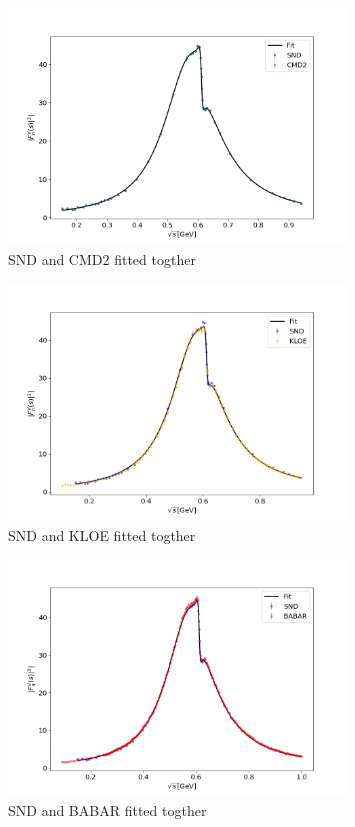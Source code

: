 \documentclass[a4paper]{article}
\begin{document}
\begin{figure}[H]
    \centering
    \includegraphics[width=0.8\textwidth]{./plots/SND-CMD2.png}
    \caption{SND and CMD2 fitted togther\label{fig5}}
\end{figure}
\begin{figure}[H]
    \centering
    \includegraphics[width=0.8\textwidth]{./plots/SND-KLOE.png}
    \caption{SND and KLOE fitted togther    \label{fig6}}
\end{figure}
\begin{figure}[H]
    \centering
    \includegraphics[width=0.8\textwidth]{./plots/SND-BABAR.png}
    \caption{SND and BABAR fitted togther   \label{fig7}}
\end{figure}
\end{document}
